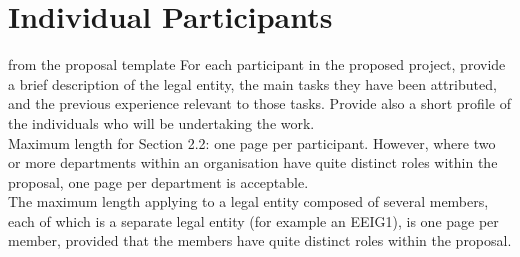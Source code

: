 \section{Individual Participants}\label{sec:partners}
\begin{todo}{from the proposal template}
For each participant in the proposed project, provide a brief description of the legal entity, the main
tasks they have been attributed, and the previous experience relevant to those tasks. Provide also a
short profile of the individuals who will be undertaking the work.\\
Maximum length for Section 2.2: one page per participant. However, where two or more departments within
an organisation have quite distinct roles within the proposal, one page per department is acceptable.\\
The maximum length applying to a legal entity composed of several members, each of which is a separate
legal entity (for example an EEIG1), is one page per member, provided that the members have quite distinct
roles within the proposal.
\end{todo}
\newpage
\newpage
\newpage
\newpage
\newpage
\newpage
\newpage
\newpage
\newpage
\newpage
\newpage
\newpage
\newpage
\newpage
\newpage
\newpage
\newpage
\newpage
\newpage
\newpage
\newpage

